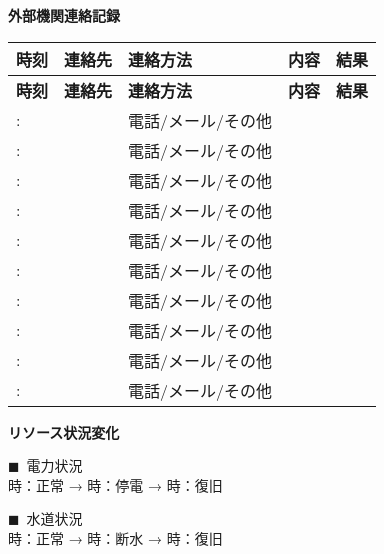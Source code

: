 \documentclass[a4paper,12pt]{jarticle}
\newcommand{\checkedbox}{$\blacksquare$\ }
\newcommand{\underlinespace}[1]{\underline{\hspace{#1}}}
\begin{document}
\begin{center}
\textbf{\large 外部機関連絡記録}
\end{center}

\vspace{3mm}

\begin{longtable}{|p{1.5cm}|p{2.5cm}|p{2cm}|p{3cm}|p{2cm}|}
\hline
\textbf{時刻} & \textbf{連絡先} & \textbf{連絡方法} & \textbf{内容} & \textbf{結果} \\
\hline
\endfirsthead
\hline
\textbf{時刻} & \textbf{連絡先} & \textbf{連絡方法} & \textbf{内容} & \textbf{結果} \\
\hline
\endhead
: &  & 電話/メール/その他 &  &  \\[0.5cm]
\hline
: &  & 電話/メール/その他 &  &  \\[0.5cm]
\hline
: &  & 電話/メール/その他 &  &  \\[0.5cm]
\hline
: &  & 電話/メール/その他 &  &  \\[0.5cm]
\hline
: &  & 電話/メール/その他 &  &  \\[0.5cm]
\hline
: &  & 電話/メール/その他 &  &  \\[0.5cm]
\hline
: &  & 電話/メール/その他 &  &  \\[0.5cm]
\hline
: &  & 電話/メール/その他 &  &  \\[0.5cm]
\hline
: &  & 電話/メール/その他 &  &  \\[0.5cm]
\hline
: &  & 電話/メール/その他 &  &  \\[0.5cm]
\hline
\end{longtable}

\begin{center}
\textbf{\large リソース状況変化}
\end{center}

\vspace{3mm}

\noindent
\checkedbox 電力状況 \\
\hspace*{1cm}\underlinespace{1cm}時：正常 → \underlinespace{1cm}時：停電 → \underlinespace{1cm}時：復旧

\vspace{2mm}

\noindent
\checkedbox 水道状況 \\
\hspace*{1cm}\underlinespace{1cm}時：正常 → \underlinespace{1cm}時：断水 → \underlinespace{1cm}時：復旧

\vspace{2mm}
\end{document}
